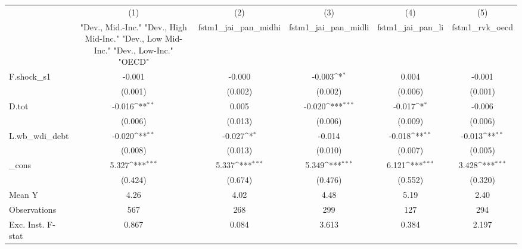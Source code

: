 {
\def\sym#1{\ifmmode^{#1}\else\(^{#1}\)\fi}
\begin{tabular}{l*{5}{c}}
\toprule
            &\multicolumn{1}{c}{(1)}&\multicolumn{1}{c}{(2)}&\multicolumn{1}{c}{(3)}&\multicolumn{1}{c}{(4)}&\multicolumn{1}{c}{(5)}\\
            &\multicolumn{1}{c}{ "Dev., Mid.-Inc." "Dev., High Mid-Inc." "Dev., Low Mid-Inc." "Dev., Low-Inc." "OECD" }&\multicolumn{1}{c}{fstm1\_jai\_pan\_midhi}&\multicolumn{1}{c}{fstm1\_jai\_pan\_midli}&\multicolumn{1}{c}{fstm1\_jai\_pan\_li}&\multicolumn{1}{c}{fstm1\_rvk\_oecd}\\
\midrule
F.shock\_s1  &      -0.001         &      -0.000         &      -0.003\sym{*}  &       0.004         &      -0.001         \\
            &     (0.001)         &     (0.002)         &     (0.002)         &     (0.006)         &     (0.001)         \\
\addlinespace
D.tot       &      -0.016\sym{**} &       0.005         &      -0.020\sym{***}&      -0.017\sym{*}  &      -0.006         \\
            &     (0.006)         &     (0.013)         &     (0.006)         &     (0.009)         &     (0.006)         \\
\addlinespace
L.wb\_wdi\_debt&      -0.020\sym{**} &      -0.027\sym{*}  &      -0.014         &      -0.018\sym{**} &      -0.013\sym{**} \\
            &     (0.008)         &     (0.013)         &     (0.010)         &     (0.007)         &     (0.005)         \\
\addlinespace
\_cons      &       5.327\sym{***}&       5.337\sym{***}&       5.349\sym{***}&       6.121\sym{***}&       3.428\sym{***}\\
            &     (0.424)         &     (0.674)         &     (0.476)         &     (0.552)         &     (0.320)         \\
\midrule
Mean Y      &        4.26         &        4.02         &        4.48         &        5.19         &        2.40         \\
Observations&         567         &         268         &         299         &         127         &         294         \\
Exc. Inst. F-stat&       0.867         &       0.084         &       3.613         &       0.384         &       2.197         \\
\bottomrule
\end{tabular}
}
